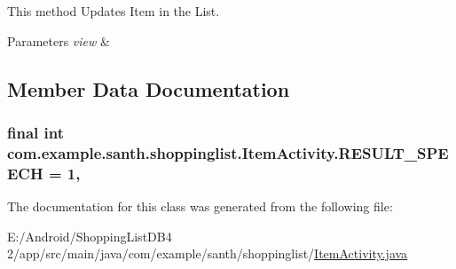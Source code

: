 This method Updates Item in the List. 


\begin{DoxyParams}{Parameters}
{\em view} & \\
\hline
\end{DoxyParams}


\subsection{Member Data Documentation}
\subsubsection[{\texorpdfstring{R\+E\+S\+U\+L\+T\+\_\+\+S\+P\+E\+E\+CH}{RESULT_SPEECH}}]{\setlength{\rightskip}{0pt plus 5cm}final int com.\+example.\+santh.\+shoppinglist.\+Item\+Activity.\+R\+E\+S\+U\+L\+T\+\_\+\+S\+P\+E\+E\+CH = 1\hspace{0.3cm}{\ttfamily [static]}, {\ttfamily [protected]}}\hypertarget{classcom_1_1example_1_1santh_1_1shoppinglist_1_1_item_activity_aea6bca838db9041a53ce0cdc68c0410b}{}\label{classcom_1_1example_1_1santh_1_1shoppinglist_1_1_item_activity_aea6bca838db9041a53ce0cdc68c0410b}


The documentation for this class was generated from the following file\+:\begin{DoxyCompactItemize}
\item 
E\+:/\+Android/\+Shopping\+List\+D\+B4 2/app/src/main/java/com/example/santh/shoppinglist/\hyperlink{_item_activity_8java}{Item\+Activity.\+java}\end{DoxyCompactItemize}
